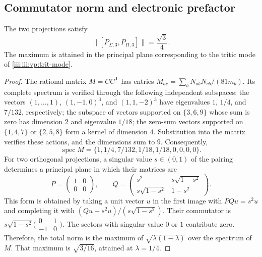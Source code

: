 \subsection{Commutator norm and electronic prefactor}

\begin{theorem}
The two projections satisfy
\begin{equation}
 \bigl\|[P_{\Sigma,3},P_{\Pi,3}]\bigr\|=\frac{\sqrt3}{4}.
 \label{iii:iii:vp:prefactor}
\end{equation}
The maximum is attained in the principal plane corresponding to the
tritic mode of \eqref{iii:iii:vp:trit-mode}.
\end{theorem}
\begin{proof}
The rational matrix $M=CC^{\mathsf T}$ has entries
$M_{ac}=\sum_bN_{ab}N_{cb}/(81m_b)$. Its complete spectrum is
verified through the following independent subspaces: the
vectors $(1,\ldots,1)$, $(1,-1,0)^3$, and $(1,1,-2)^3$ have
eigenvalues $1$, $1/4$, and $7/132$, respectively; the subspace of
vectors supported on $\{3,6,9\}$ whose sum is zero has dimension
$2$ and eigenvalue $1/18$; the zero-sum vectors supported on
$\{1,4,7\}$ or $\{2,5,8\}$ form a kernel of dimension $4$.
Substitution into the matrix verifies these actions, and the dimensions
sum to $9$. Consequently,
\[
 \operatorname{spec}M=
 \{1,1/4,7/132,1/18,1/18,0,0,0,0\}.
\]
For two orthogonal projections, a singular value $s\in(0,1)$ of the
pairing determines a principal plane in which their matrices are
\[
 P=\begin{pmatrix}1&0\\0&0\end{pmatrix},\qquad
 Q=\begin{pmatrix}s^2&s\sqrt{1-s^2}\\
 s\sqrt{1-s^2}&1-s^2\end{pmatrix}.
\]
This form is obtained by taking a unit vector $u$ in the first
image with $PQu=s^2u$ and completing it with
$(Qu-s^2u)/(s\sqrt{1-s^2})$. Their commutator is
$s\sqrt{1-s^2}\bigl(\begin{smallmatrix}0&1\\-1&0\end{smallmatrix}\bigr)$.
The sectors with singular value $0$ or $1$ contribute zero.
Therefore, the total norm is the maximum of
$\sqrt{\lambda(1-\lambda)}$ over the spectrum of $M$. That maximum
is $\sqrt{3/16}$, attained at $\lambda=1/4$.
\end{proof}

